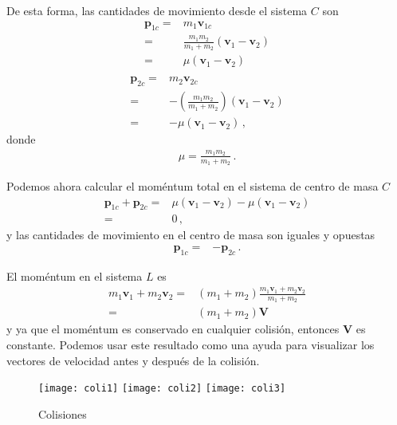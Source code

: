 De esta forma, las cantidades de movimiento desde el sistema $C$ son
\begin{align}
  \mathbf{p}_{1c}=&m_1\mathbf{v}_{1c}\nonumber\\
                =&\frac{m_1m_2}{m_1+m_2}(\mathbf{v}_1-\mathbf{v}_2)\nonumber\\
                =&\mu(\mathbf{v}_1-\mathbf{v}_2)\nonumber\\
\end{align}
\begin{align}
    \mathbf{p}_{2c}=&m_2\mathbf{v}_{2c}\nonumber\\
    =&-\left(\frac{m_1m_2}{m_1+m_2} \right)\left(\mathbf{v}_1-\mathbf{v}_2 \right)\nonumber\\
                =&-\mu(\mathbf{v}_1-\mathbf{v}_2)\,,
\end{align}
donde
\begin{align}
  \mu=\frac{m_1m_2}{m_1+m_2}\,.
\end{align}

Podemos ahora calcular el moméntum total en el sistema de centro de masa $C$
\begin{align*}
\mathbf{p}_{1c}+\mathbf{p}_{2c}=&\mu(\mathbf{v}_1-\mathbf{v}_2)
-\mu(\mathbf{v}_1-\mathbf{v}_2)\nonumber\\
=&0\,,
\end{align*}
y las cantidades de movimiento en el centro de masa son iguales y opuestas
\begin{align}
  \mathbf{p}_{1c}=&-\mathbf{p}_{2c}\,.
\end{align}

El moméntum en el sistema $L$ es
\begin{align*}
  m_1\mathbf{v}_1+m_2\mathbf{v}_2=&(m_1+m_2)\frac{m_1\mathbf{v}_1+m_2\mathbf{v}_2}{m_1+m_2}\nonumber\\
  =&(m_1+m_2)\mathbf{V}
\end{align*}
y ya que el moméntum es conservado en cualquier colisión, entonces
$\mathbf{V}$ es constante. 
Podemos usar este resultado como una ayuda para visualizar los
vectores de velocidad antes y después de la colisión.

\begin{figure}
  \centering
  \texttt{[image: coli1]}
  \texttt{[image: coli2]}
  \texttt{[image: coli3]}

\hspace{7cm}{(c)}
  \caption{Colisiones}
  \label{fig:coli}
\end{figure}

